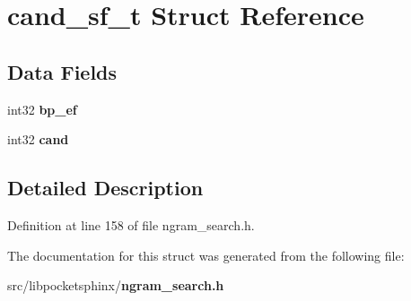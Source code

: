 \section{cand\+\_\+sf\+\_\+t Struct Reference}
\label{structcand__sf__t}
\subsection*{Data Fields}
\begin{DoxyCompactItemize}
\item 
int32 {\bfseries bp\+\_\+ef}\label{structcand__sf__t_ab04890bd8e455c234bf78aec9dab8803}

\item 
int32 {\bfseries cand}\label{structcand__sf__t_a7fcc5ff33fe4ad1a57d1acc272a29f36}

\end{DoxyCompactItemize}


\subsection{Detailed Description}


Definition at line 158 of file ngram\+\_\+search.\+h.



The documentation for this struct was generated from the following file\+:\begin{DoxyCompactItemize}
\item 
src/libpocketsphinx/{\bf ngram\+\_\+search.\+h}\end{DoxyCompactItemize}
